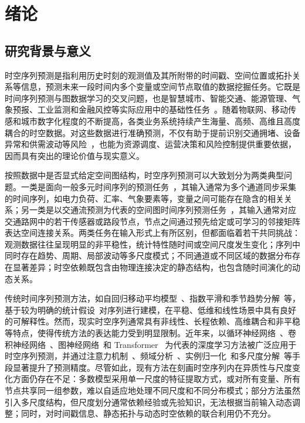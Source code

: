 \chapter{绪论}

\section{研究背景与意义}

时空序列预测是指利用历史时刻的观测值及其所附带的时间戳、空间位置或拓扑关系等信息，预测未来一段时间内多个变量或空间节点取值的数据挖掘任务。它既是时间序列预测与图数据学习的交叉问题，也是智慧城市、智能交通、能源管理、气象预报、工业监测和金融风控等实际应用中的基础性任务~\cite{deep-air, survey-ts-zh,survey-stf-zh,survey-ts-transformer-zh, financial-ts}。随着物联网、移动传感和城市数字化程度的不断提高，各类业务系统持续产生海量、高频、高维且高度耦合的时空数据。对这些数据进行准确预测，不仅有助于提前识别交通拥堵、设备异常和供需波动等风险~\cite{tkde-caem, traffic-flow, attention-mixer, deeptrans}，也能为资源调度、运营决策和风险控制提供重要依据，因而具有突出的理论价值与现实意义。

按照数据中是否显式给定空间图结构，时空序列预测可以大致划分为两类典型问题。一类是面向一般多元时间序列的预测任务~\cite{kim2024comprehensive}，其输入通常为多个通道同步采集的时间序列，如电力负荷、汇率、气象要素等，变量之间可能存在隐含的相关关系；另一类是以交通流预测为代表的空间图时间序列预测任务~\cite{traffic-stf-survey,survey01}，其输入通常对应交通路网中的若干传感器或路段节点，节点之间通过预先给定或可学习的邻接矩阵表达空间连接关系。两类任务在输入形式上有所区别，但都面临着若干共同挑战：观测数据往往呈现明显的非平稳性，统计特性随时间或空间尺度发生变化；序列中同时存在趋势、周期、局部波动等多尺度模式；不同通道或不同区域的数据分布存在显著差异；时空依赖既包含由物理连接决定的静态结构，也包含随时间演化的动态关系。

传统时间序列预测方法，如自回归移动平均模型~\cite{brockwell1991time,deepar}、指数平滑和季节趋势分解~\cite{1990STL}等，基于较为明确的统计假设~\cite{mlstf}对序列进行建模，在平稳、低维和线性场景中具有良好的可解释性。然而，现实时空序列通常具有非线性、长程依赖、高维耦合和非平稳等特点，使得传统方法的表达能力受到明显限制。近年来，以循环神经网络~\cite{adarnn,dcrnn,mixrnn+}、卷积神经网络~\cite{micn,cnn_related1}、图神经网络~\cite{mc-stgcn,gnn4ts-survey,astgnn,d2stgnn,solar-graph-atten}和 Transformer~\cite{informer,autoformer,pyraformer,itransformer} 为代表的深度学习方法被广泛应用于时空序列预测，并通过注意力机制~\cite{wen2023transformers}、频域分析~\cite{gwnet,duet}、实例归一化~\cite{revin,st-norm}和多尺度分解~\cite{timemixer,pyraformer,higp}等手段显著提升了预测精度。尽管如此，现有方法在刻画时空序列内在异质性与尺度变化方面仍存在不足：多数模型采用单一尺度的特征提取方式，或对所有变量、所有节点共享同一组参数，难以自适应地处理不同尺度和不同分布模式；部分方法虽然引入多尺度结构，但尺度划分通常依赖经验或先验知识，无法根据当前输入动态调整；同时，对时间戳信息、静态拓扑与动态时空依赖的联合利用仍不充分。

